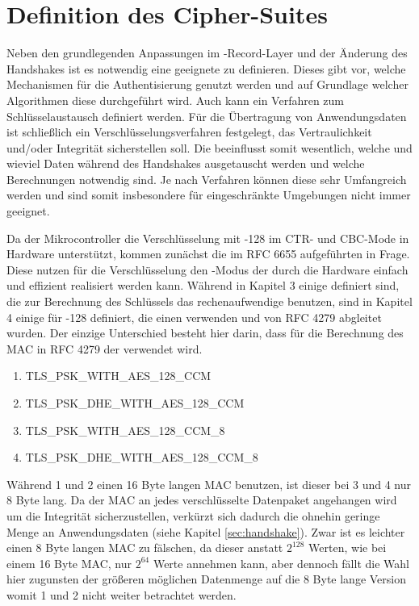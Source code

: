\chapter{Definition des Cipher-Suites}

Neben den grundlegenden Anpassungen im -Record-Layer und der Änderung des Handshakes ist es notwendig eine geeignete  zu definieren.
Dieses gibt vor, welche Mechanismen für die Authentisierung genutzt werden und auf Grundlage welcher Algorithmen diese durchgeführt wird. Auch kann
ein Verfahren zum Schlüsselaustausch definiert werden. Für die Übertragung von Anwendungsdaten ist schließlich ein Verschlüsselungsverfahren festgelegt,
das Vertraulichkeit und/oder Integrität sicherstellen soll. Die  beeinflusst somit wesentlich, welche und wieviel Daten während des Handshakes
ausgetauscht werden und welche Berechnungen notwendig sind. Je nach Verfahren können diese sehr Umfangreich werden und sind somit insbesondere für eingeschränkte
Umgebungen nicht immer geeignet.

Da der Mikrocontroller die Verschlüsselung mit -128 im CTR- und CBC-Mode in Hardware unterstützt, kommen zunächst die im RFC 6655 \cite{rfc6655}
aufgeführten  in Frage. Diese nutzen für die Verschlüsselung den -Modus der durch die Hardware einfach und effizient realisiert werden
kann. Während in Kapitel 3 einige  definiert sind, die zur Berechnung des Schlüssels das rechenaufwendige  benutzen, sind in Kapitel 4
einige  für -128 definiert, die einen  verwenden und von RFC 4279 \cite{rfc4279} abgleitet wurden. Der einzige Unterschied besteht
hier darin, dass für die Berechnung des MAC in RFC 4279 der  verwendet wird.
\begin{enumerate}
  \item TLS\_PSK\_WITH\_AES\_128\_CCM
  \item TLS\_PSK\_DHE\_WITH\_AES\_128\_CCM
  \item TLS\_PSK\_WITH\_AES\_128\_CCM\_8
  \item TLS\_PSK\_DHE\_WITH\_AES\_128\_CCM\_8
\end{enumerate}
Während 1 und 2 einen 16 Byte langen MAC benutzen, ist dieser bei 3 und 4 nur 8 Byte lang. Da der MAC an jedes verschlüsselte Datenpaket angehangen wird um die
Integrität sicherzustellen, verkürzt sich dadurch die ohnehin geringe Menge an Anwendungsdaten (siehe Kapitel \ref{sec:handshake}). Zwar ist es leichter
einen 8 Byte langen MAC zu fälschen, da dieser anstatt $ 2^128 $ Werten, wie bei einem 16 Byte MAC, nur $ 2^64 $ Werte annehmen kann, aber dennoch fällt die
Wahl hier zugunsten der größeren möglichen Datenmenge auf die 8 Byte lange Version womit  1 und 2 nicht weiter betrachtet werden.

